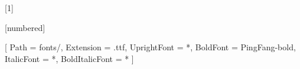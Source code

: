 \RequirePackage{wrapfig}
\RequirePackage{pgfplots}
\RequirePackage{graphicx}
\RequirePackage{adjustbox}
\RequirePackage{environ}
\pgfplotsset{compat=1.18}

\makeatletter
\newsavebox{\measure@tikzpicture}
[1]{%
  \def\tikz@width{#1}%
  \def\tikzscale{1}\begin{lrbox}{\measure@tikzpicture}%
  \BODY
  \end{lrbox}%
  \edef\tikzscale{\pgfmathresult}%
  \BODY
}
\makeatother

\RequirePackage{textcomp}
\RequirePackage{amsmath}
\RequirePackage{amsthm}
\RequirePackage{mathtools}
\DeclareMathOperator*{\argmax}{arg\,max}
\DeclareMathOperator*{\argmin}{arg\,min}

[numbered] %

\theoremstyle{definition}
\newtheorem{fact}{Fact}[section]
\newtheorem{examp}{Example}[section]

\theoremstyle{plain}
\newtheorem{definition}{Definition}[section]
\newtheorem{proposition}{Proposition}
\newtheorem{theorem}{Theorem}
\newtheorem{assumption}{Assumption}

\providecommand{\H}{\mathscr{H}}
\providecommand{\E}{\mathbb{E}}
\makeatletter
\def\munderbar#1{\underline{\sbox\tw@{$#1$}\dp\tw@\z@\box\tw@}}
\makeatother
\usepackage{fontspec}
\usepackage{xeCJK}

[
    Path = fonts/,
    Extension = .ttf,
    UprightFont = *,
    BoldFont = PingFang-bold,
    ItalicFont = *,
    BoldItalicFont = *
]
